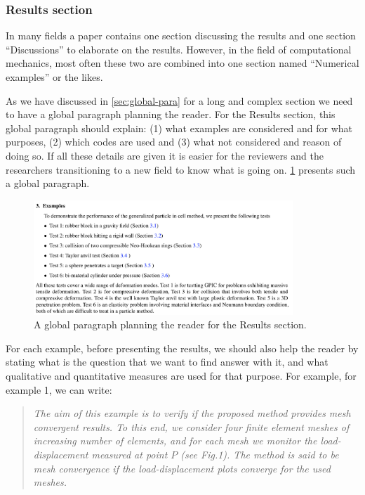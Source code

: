 \documentclass[authoryear,12pta4paper,fleqn]{article}
\numberwithin{equation}{section}
\theoremstyle{remark}
\begin{document}
\subsubsection{Results section}\label{sec:result}

In many fields a paper contains one section discussing the results and one section ``Discussions'' to elaborate on the results. However, in the field of computational mechanics, most often these two are combined into one section named ``Numerical examples'' or the likes.

As we have discussed in \cref{sec:global-para} for a long and complex section we need to have a global paragraph planning the reader. For the Results section, this global paragraph should explain: (1) what examples are considered and for what purposes, (2) which codes are used and (3) what not considered and reason of doing so. If all these details are given it is easier for the reviewers and the researchers transitioning to a new field to know what is going on. \cref{fig:examples} presents such a global paragraph.

\begin{figure}[h!]
\centering
\includegraphics[width=0.87\textwidth]{examples}
\caption{A global paragraph planning the reader for the Results section.}
\label{fig:examples}
\end{figure}

For each example, before presenting the results, we should also help the reader by stating what is the question that we want to find answer with it, and what qualitative and quantitative measures are used for that purpose. For example, for example 1, we can write:

\begin{quote}
  \textit{
  The aim of this example is to verify if the proposed method provides mesh convergent results. To this end, we consider four finite element meshes of increasing number of elements, and for each mesh we monitor the load-displacement measured at point $P$ (see Fig.1). The method is said to be mesh convergence if the load-displacement plots converge for the used meshes.
  }
\end{quote}
\end{document}
